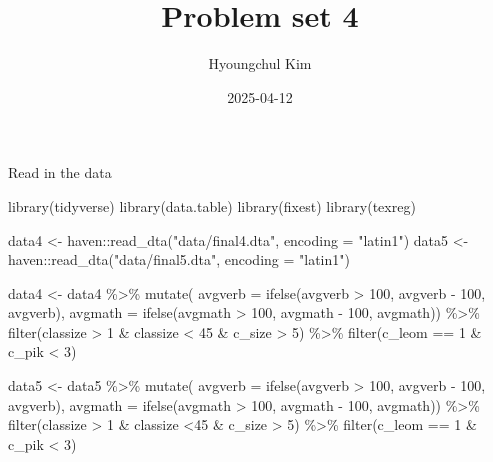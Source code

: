 \documentclass[
  letterpaper,
  DIV=11,
  numbers=noendperiod]{scrartcl}
\title{Problem set 4}
\author{Hyoungchul Kim}
\date{2025-04-12}
\newenvironment{Shaded}{\begin{snugshade}}{\end{snugshade}}
\newcommand{\AttributeTok}[1]{\textcolor[rgb]{0.40,0.45,0.13}{#1}}
\newcommand{\DecValTok}[1]{\textcolor[rgb]{0.68,0.00,0.00}{#1}}
\newcommand{\FunctionTok}[1]{\textcolor[rgb]{0.28,0.35,0.67}{#1}}
\newcommand{\NormalTok}[1]{\textcolor[rgb]{0.00,0.23,0.31}{#1}}
\newcommand{\OtherTok}[1]{\textcolor[rgb]{0.00,0.23,0.31}{#1}}
\newcommand{\SpecialCharTok}[1]{\textcolor[rgb]{0.37,0.37,0.37}{#1}}
\newcommand{\StringTok}[1]{\textcolor[rgb]{0.13,0.47,0.30}{#1}}
\begin{document}
\maketitle


Read in the data

\begin{Shaded}
\begin{Highlighting}[]
\FunctionTok{library}\NormalTok{(tidyverse)}
\FunctionTok{library}\NormalTok{(data.table)}
\FunctionTok{library}\NormalTok{(fixest)}
\FunctionTok{library}\NormalTok{(texreg) }

\NormalTok{data4 }\OtherTok{\textless{}{-}}\NormalTok{ haven}\SpecialCharTok{::}\FunctionTok{read\_dta}\NormalTok{(}\StringTok{"data/final4.dta"}\NormalTok{, }\AttributeTok{encoding =} \StringTok{"latin1"}\NormalTok{)}
\NormalTok{data5 }\OtherTok{\textless{}{-}}\NormalTok{ haven}\SpecialCharTok{::}\FunctionTok{read\_dta}\NormalTok{(}\StringTok{"data/final5.dta"}\NormalTok{, }\AttributeTok{encoding =} \StringTok{"latin1"}\NormalTok{)}

\NormalTok{data4 }\OtherTok{\textless{}{-}}\NormalTok{ data4 }\SpecialCharTok{\%\textgreater{}\%} \FunctionTok{mutate}\NormalTok{(}
  \AttributeTok{avgverb =} \FunctionTok{ifelse}\NormalTok{(avgverb }\SpecialCharTok{\textgreater{}} \DecValTok{100}\NormalTok{, avgverb }\SpecialCharTok{{-}} \DecValTok{100}\NormalTok{, avgverb),}
  \AttributeTok{avgmath =} \FunctionTok{ifelse}\NormalTok{(avgmath }\SpecialCharTok{\textgreater{}} \DecValTok{100}\NormalTok{, avgmath }\SpecialCharTok{{-}} \DecValTok{100}\NormalTok{, avgmath)) }\SpecialCharTok{\%\textgreater{}\%} 
  \FunctionTok{filter}\NormalTok{(classize }\SpecialCharTok{\textgreater{}} \DecValTok{1} \SpecialCharTok{\&}\NormalTok{ classize }\SpecialCharTok{\textless{}} \DecValTok{45} \SpecialCharTok{\&}\NormalTok{ c\_size }\SpecialCharTok{\textgreater{}} \DecValTok{5}\NormalTok{) }\SpecialCharTok{\%\textgreater{}\%} 
  \FunctionTok{filter}\NormalTok{(c\_leom }\SpecialCharTok{==} \DecValTok{1} \SpecialCharTok{\&}\NormalTok{ c\_pik }\SpecialCharTok{\textless{}} \DecValTok{3}\NormalTok{)}

\NormalTok{data5 }\OtherTok{\textless{}{-}}\NormalTok{ data5 }\SpecialCharTok{\%\textgreater{}\%} \FunctionTok{mutate}\NormalTok{(}
  \AttributeTok{avgverb =} \FunctionTok{ifelse}\NormalTok{(avgverb }\SpecialCharTok{\textgreater{}} \DecValTok{100}\NormalTok{, avgverb }\SpecialCharTok{{-}} \DecValTok{100}\NormalTok{, avgverb),}
  \AttributeTok{avgmath =} \FunctionTok{ifelse}\NormalTok{(avgmath }\SpecialCharTok{\textgreater{}} \DecValTok{100}\NormalTok{, avgmath }\SpecialCharTok{{-}} \DecValTok{100}\NormalTok{, avgmath)) }\SpecialCharTok{\%\textgreater{}\%} 
  \FunctionTok{filter}\NormalTok{(classize }\SpecialCharTok{\textgreater{}} \DecValTok{1} \SpecialCharTok{\&}\NormalTok{ classize }\SpecialCharTok{\textless{}}\DecValTok{45} \SpecialCharTok{\&}\NormalTok{ c\_size }\SpecialCharTok{\textgreater{}} \DecValTok{5}\NormalTok{) }\SpecialCharTok{\%\textgreater{}\%} 
  \FunctionTok{filter}\NormalTok{(c\_leom }\SpecialCharTok{==} \DecValTok{1} \SpecialCharTok{\&}\NormalTok{ c\_pik }\SpecialCharTok{\textless{}} \DecValTok{3}\NormalTok{)}
\end{Highlighting}
\end{Shaded}
\end{document}
